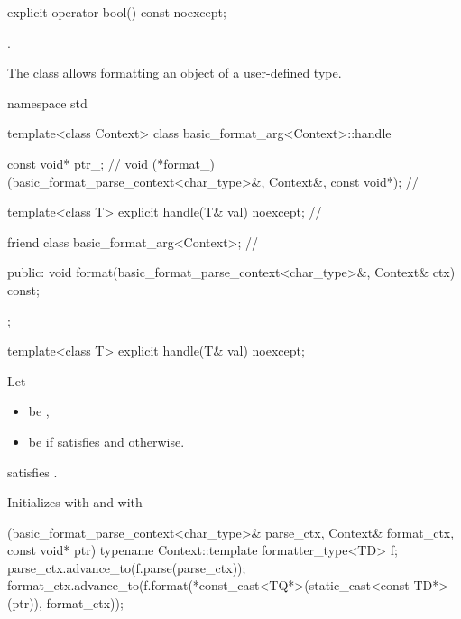 %

%
\begin{itemdecl}
explicit operator bool() const noexcept;
\end{itemdecl}

\begin{itemdescr}
\pnum
\returns
{}.
\end{itemdescr}

\pnum
The class  allows formatting an object of a user-defined type.

%
%
\begin{codeblock}
namespace std {
  template<class Context>
  class basic_format_arg<Context>::handle {
    const void* ptr_;                                           // \expos
    void (*format_)(basic_format_parse_context<char_type>&,
                    Context&, const void*);                     // \expos

    template<class T> explicit handle(T& val) noexcept;         // \expos

    friend class basic_format_arg<Context>;                     // \expos

  public:
    void format(basic_format_parse_context<char_type>&, Context& ctx) const;
  };
}
\end{codeblock}

%
\begin{itemdecl}
template<class T> explicit handle(T& val) noexcept;
\end{itemdecl}

\begin{itemdescr}
\pnum
Let
\begin{itemize}
\item
{} be ,
\item
{} be  if
 satisfies 
and  otherwise.
\end{itemize}

\pnum
\mandates
{} satisfies .

\pnum
\effects
Initializes
 with  and
 with
\begin{codeblock}
[](basic_format_parse_context<char_type>& parse_ctx,
   Context& format_ctx, const void* ptr) {
  typename Context::template formatter_type<TD> f;
  parse_ctx.advance_to(f.parse(parse_ctx));
  format_ctx.advance_to(f.format(*const_cast<TQ*>(static_cast<const TD*>(ptr)),
                                 format_ctx));
}
\end{codeblock}
\end{itemdescr}

